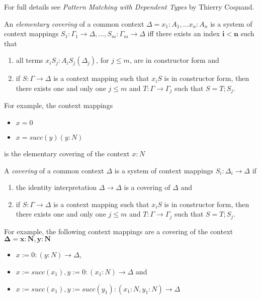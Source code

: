 For full details see \textit{Pattern Matching with Dependent Types} by Thierry Coquand.

An \textit{elementary covering} of a common context $\Delta = x_1 : A_1,...x_n : A_n$ is a system of context mappings $S_1 : \Gamma_1 \to \Delta, ..., S_m : \Gamma_m \to \Delta$ iff there exists an index $\boldsymbol{i < n}$ such that

\begin{enumerate}
  \item all terms $x_iS_j : A_iS_j(\Delta_j)$, for $j \leq m$, are in constructor form and
  \item if $S : \Gamma \to \Delta$ is a context mapping such that $x_iS$ is in constructor form, then there exists one and only one $j \leq m$ and $T : \Gamma \to \Gamma_j$ such that $S=T;S_j$.
  
\end{enumerate}

For example, the context mappings

\begin{itemize}
  \item $x = 0$
  \item $x = succ(y) (y : N)$
\end{itemize}

is the elementary covering of the context $x : N$

A \textit{covering} of a common context $\Delta$ is a system of context mappings $S_i : \Delta_i \to \Delta$ if

\begin{enumerate}
  \item the identity interpretation $\Delta \to \Delta$ is a covering of $\Delta$ and
  \item if $S : \Gamma \to \Delta$ is a context mapping such that $x_iS$ is in constructor form, then there exists one and only one $j \leq m$ and $T : \Gamma \to \Gamma_j$ such that $S = T;S_j$. 
\end{enumerate}

For example, the following context mappings are a covering of the context $\boldsymbol{\Delta = x : N, y : N}$

\begin{itemize}
  \item ${x := 0} : (y : N) \to \Delta$,
  \item ${x := succ(x_1), y:= 0} : (x_1 : N) \to \Delta$ and
  \item ${x := succ(x_1), y:= succ(y_1)} : (x_1 : N, y_1 : N) \to \Delta$
\end{itemize}

